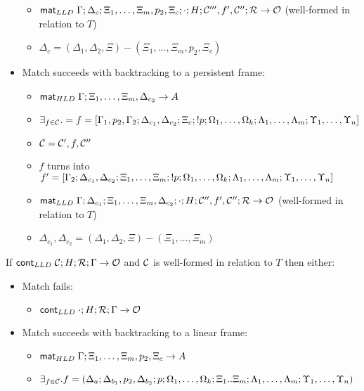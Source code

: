 \begin{lemma}
\begin{itemize}[leftmargin=*]
\begin{itemize}[leftmargin=\secondm]
      \item $\mathsf{mat}_{LLD} \; \Gamma; \Delta_c; \Xi_1, \dotsc, \Xi_m, p_2, \Xi_c; \cdot; H;
            \mathcal{C'''}, f', \mathcal{C''}; \mathcal{R} \rightarrow \mathcal{O}$ (well-formed in
                  relation to $T$)
      \item $\Delta_c = (\Delta_1, \Delta_2, \Xi) - (\Xi_1, \dotsc, \Xi_m, p_2, \Xi_c)$
   \end{itemize}

   \item Match succeeds with backtracking to a persistent frame:
   \begin{itemize}[leftmargin=\secondm]
      \item $\mathsf{mat}_{HLD} \; \Gamma; \Xi_1, \dotsc, \Xi_m, \Delta_{c_2} \rightarrow A$
      \item $\exists_{f \in \mathcal{C}}. = f = [\Gamma_1, p_2, \Gamma_2; \Delta_{c_1}, \Delta_{c_2}; \Xi_c; {!}
         p; \Omega_1, \dotsc, \Omega_k; \Lambda_1, \dotsc, \Lambda_m;
         \Upsilon_1, \dotsc, \Upsilon_n]$
      \item $\mathcal{C} = \mathcal{C'}, f, \mathcal{C''}$
      \item $f$ turns into $f' = [\Gamma_2; \Delta_{c_1}, \Delta_{c_2}; \Xi_1, \dotsc,
         \Xi_m; {!} p; \Omega_1, \dotsc, \Omega_k; \Lambda_1, \dotsc,
         \Lambda_m; \Upsilon_1, \dotsc, \Upsilon_n]$
      \item $\mathsf{mat}_{LLD} \; \Gamma; \Delta_{c_1}; \Xi_1, \dotsc, \Xi_m, \Delta_{c_2};
         \cdot; H; \mathcal{C''}, f', \mathcal{C''}; \mathcal{R} \rightarrow \mathcal{O}$ (well-formed in
            relation to $T$)
      \item $\Delta_{c_1}, \Delta_{c_2} = (\Delta_1, \Delta_2,
            \Xi) - (\Xi_1, \dotsc, \Xi_m)$
   \end{itemize}
\end{itemize}

If $\mathsf{cont}_{LLD} \; \mathcal{C}; H; \mathcal{R}; \Gamma \rightarrow \mathcal{O}$ and $\mathcal{C}$ is
well-formed in relation to $T$ then either:

\begin{itemize}[leftmargin=*]
   \item Match fails:
   \begin{itemize}[leftmargin=\secondm]
      \item $\mathsf{cont}_{LLD} \; \cdot; H; \mathcal{R}; \Gamma \rightarrow \mathcal{O}$
   \end{itemize}

   \item Match succeeds with backtracking to a linear frame:
   \begin{itemize}[leftmargin=\secondm]
      \item $\mathsf{mat}_{HLD} \; \Gamma; \Xi_1, \dotsc, \Xi_m, p_2, \Xi_c \rightarrow A$
      \item $\exists_{f \in \mathcal{C}}. f = (\Delta_a; \Delta_{b_1}, p_2, \Delta_{b_2}; p;
            \Omega_1, \dotsc, \Omega_k; \Xi_1 .. \Xi_m; \Lambda_1, \dotsc,
            \Lambda_m; \Upsilon_1, \dotsc, \Upsilon_n)$


\end{itemize}
\end{itemize}
\end{lemma}
